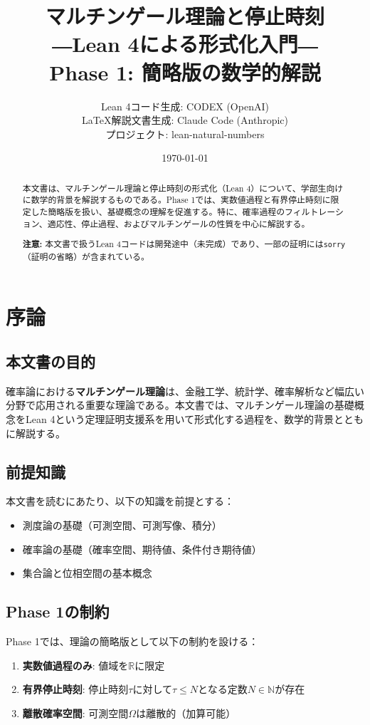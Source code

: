 \documentclass[a4paper,11pt]{ltjsarticle}
\title{マルチンゲール理論と停止時刻\\
  ―Lean 4による形式化入門―\\
  \large Phase 1: 簡略版の数学的解説}
\author{
  Lean 4コード生成: CODEX (OpenAI)\\
  \LaTeX 解説文書生成: Claude Code (Anthropic)\\
  \small プロジェクト: lean-natural-numbers
}
\date{\today}
\theoremstyle{definition}
\begin{document}
\maketitle

\begin{abstract}
本文書は、マルチンゲール理論と停止時刻の形式化（Lean 4）について、学部生向けに数学的背景を解説するものである。Phase 1では、実数値過程と有界停止時刻に限定した簡略版を扱い、基礎概念の理解を促進する。特に、確率過程のフィルトレーション、適応性、停止過程、およびマルチンゲールの性質を中心に解説する。

\textbf{注意:} 本文書で扱うLean 4コードは開発途中（未完成）であり、一部の証明には\texttt{sorry}（証明の省略）が含まれている。
\end{abstract}

\tableofcontents
\newpage

\section{序論}

\subsection{本文書の目的}

確率論における\textbf{マルチンゲール理論}は、金融工学、統計学、確率解析など幅広い分野で応用される重要な理論である。本文書では、マルチンゲール理論の基礎概念をLean 4という定理証明支援系を用いて形式化する過程を、数学的背景とともに解説する。

\subsection{前提知識}

本文書を読むにあたり、以下の知識を前提とする：
\begin{itemize}
  \item 測度論の基礎（可測空間、可測写像、積分）
  \item 確率論の基礎（確率空間、期待値、条件付き期待値）
  \item 集合論と位相空間の基本概念
\end{itemize}

\subsection{Phase 1の制約}

Phase 1では、理論の簡略版として以下の制約を設ける：
\begin{enumerate}
  \item \textbf{実数値過程のみ}: 値域を$\mathbb{R}$に限定
  \item \textbf{有界停止時刻}: 停止時刻$\tau$に対して$\tau \leq N$となる定数$N \in \mathbb{N}$が存在
  \item \textbf{離散確率空間}: 可測空間$\Omega$は離散的（加算可能）
\end{enumerate}
\end{document}
